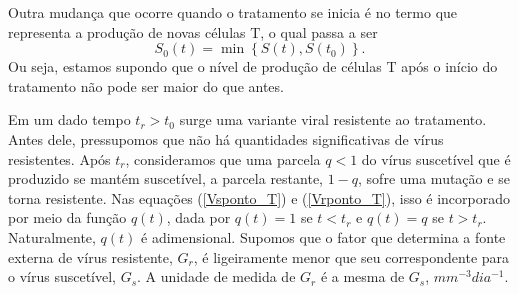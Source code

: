 Outra mudança que ocorre quando o tratamento se inicia é no termo que representa a produção de novas células T, o qual passa a ser
\begin{equation}
    S_{ 0 } ( t ) = \min \left\{ S ( t ), S ( t_{ 0 } ) \right\}
    \label{eq: S_0}
.\end{equation}
Ou seja, estamos supondo que o nível de produção de células T após o início do tratamento não pode ser maior do que antes.

Em um dado tempo \( t_{ r } > t_{ 0 } \) surge uma variante viral resistente ao tratamento.
Antes dele, pressupomos que não há quantidades significativas de vírus resistentes.
Após \( t_{ r } \), consideramos que uma parcela \( q < 1 \) do vírus suscetível que é produzido se mantém suscetível, a parcela restante, \( 1 - q \), sofre uma mutação e se torna resistente.
Nas equações (\ref{Vsponto_T}) e (\ref{Vrponto_T}), isso é incorporado por meio da função \( q ( t ) \), dada por \( q ( t ) = 1 \) se \( t < t_{ r } \) e \( q ( t ) = q \) se \( t > t_{ r } \).
Naturalmente, \( q ( t ) \) é adimensional.
Supomos que o fator que determina a fonte externa de vírus resistente, \( G_{ r } \), é ligeiramente menor que seu correspondente para o vírus suscetível, \( G_{ s } \).
A unidade de medida de \( G_{ r } \) é a mesma de \( G_{ s } \), \( \unit{mm^{ -3 }dia^{ -1 }} \).
